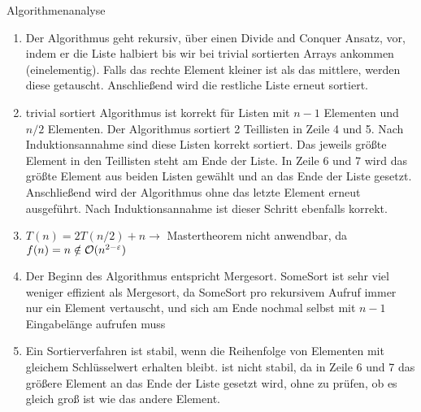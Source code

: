 \documentclass{article}
\begin{document}
\begin{exercise}{Algorithmenanalyse}
  \begin{solution}
    \begin{enumerate}
      \item Der Algorithmus geht rekursiv, über einen Divide and Conquer Ansatz, vor, indem er die Liste halbiert bis wir bei trivial sortierten Arrays ankommen (einelementig). Falls das rechte Element kleiner ist als das mittlere, werden diese getauscht. Anschließend wird die restliche Liste erneut sortiert.
      \item \begin{induction}[|L|]
              \base[1] trivial sortiert
              \cond Algorithmus ist korrekt für Listen mit $n-1$ Elementen und $n/2$ Elementen.
              \step Der Algorithmus sortiert 2 Teillisten in Zeile 4 und 5. Nach Induktionsannahme sind diese Listen korrekt sortiert. Das jeweils größte Element in den Teillisten steht am Ende der Liste. In Zeile 6 und 7 wird das größte Element aus beiden Listen gewählt und an das Ende der Liste gesetzt. Anschließend wird der Algorithmus ohne das letzte Element erneut ausgeführt. Nach Induktionsannahme ist dieser Schritt ebenfalls korrekt.
            \end{induction}
      \item $T(n) = 2T(n/2) + n \to$ Mastertheorem nicht anwendbar, da $f(n) = n \notin \mathcal{O}(n^{2-\varepsilon})$
      \item Der Beginn des Algorithmus entspricht Mergesort. SomeSort ist sehr viel weniger effizient als Mergesort, da SomeSort pro rekursivem Aufruf immer nur ein Element vertauscht, und sich am Ende nochmal selbst mit $n-1$ Eingabelänge aufrufen muss
      \item Ein Sortierverfahren ist stabil, wenn die Reihenfolge von Elementen mit gleichem Schlüsselwert erhalten bleibt.  ist nicht stabil, da in Zeile 6 und 7 das größere Element an das Ende der Liste gesetzt wird, ohne zu prüfen, ob es gleich groß ist wie das andere Element.
    \end{enumerate}
  \end{solution}
\end{exercise}
\end{document}
